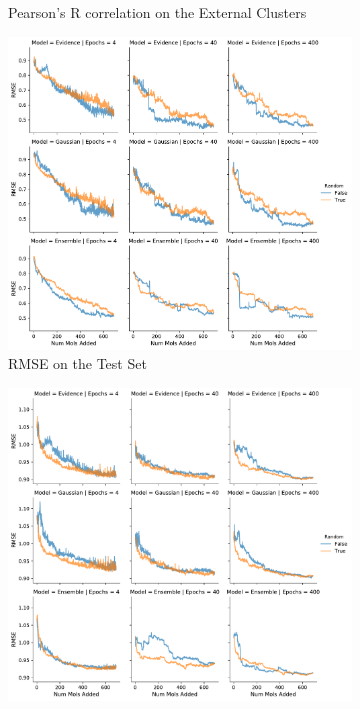 \documentclass[journal=jmcmar,manuscript=article]{achemso}
\begin{document}
\begin{figure}[tbph]
\begin{subfigure}[b]{0.48\textwidth}
        \caption{Pearson's R correlation on the External Clusters}
    \end{subfigure}%
    \hfill
    \begin{subfigure}[b]{0.48\textwidth}
        \includegraphics[width=1\linewidth]{figures/fig9_morgan_fp_bylabel_RMSE.pdf}
        \caption{RMSE on the Test Set}
    \end{subfigure}%
    \hfill
    \begin{subfigure}[b]{0.48\textwidth}
        \includegraphics[width=1\linewidth]{figures/fig9_morgan_fp_bylabel_rest_RMSE.pdf}

\end{subfigure}
\end{figure}
\end{document}
